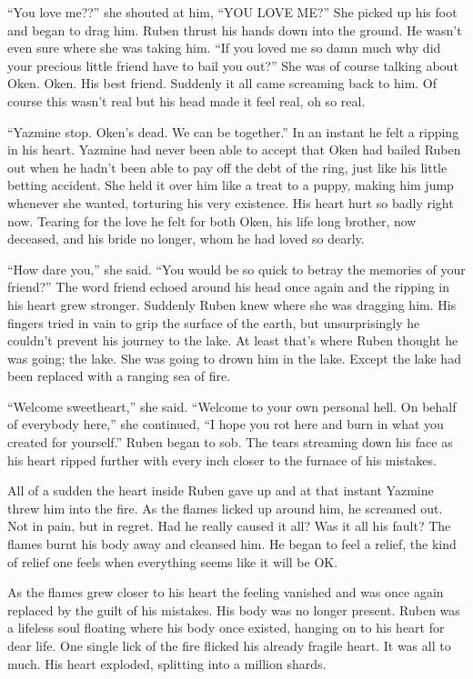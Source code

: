 ``You love me??'' she shouted at him, ``YOU LOVE ME?''  She picked up his foot and began to drag him.  Ruben thrust his hands down into the ground.  He wasn't even sure where she was taking him.  ``If you loved me so damn much why did your precious little friend have to bail you out?''  She was of course talking about Oken.  Oken.  His best friend.  Suddenly it all came screaming back to him.  Of course this wasn't real but his head made it feel real, oh so real.  

``Yazmine stop.  Oken's dead.  We can be together.''  In an instant he felt a ripping in his heart.  Yazmine had never been able to accept that Oken had bailed Ruben out when he hadn't been able to pay off the debt of the ring, just like his little betting accident.  She held it over him like a treat to a puppy, making him jump whenever she wanted, torturing his very existence.  His heart hurt so badly right now.  Tearing for the love he felt for both Oken, his life long brother, now deceased, and his bride no longer, whom he had loved so dearly.

``How dare you,'' she said.  ``You would be so quick to betray the memories of your friend?''  The word friend echoed around his head once again and the ripping in his heart grew stronger.  Suddenly Ruben knew where she was dragging him.  His fingers tried in vain to grip the surface of the earth, but unsurprisingly he couldn't prevent his journey to the lake.  At least that's where Ruben thought he was going;  the lake.  She was going to drown him in the lake.  Except the lake had been replaced with a ranging sea of fire.  

``Welcome sweetheart,'' she said.  ``Welcome to your own personal hell.  On behalf of everybody here,'' she continued, ``I hope you rot here and burn in what you created for yourself.''  Ruben began to sob.  The tears streaming down his face as his heart ripped further with every inch closer to the furnace of his mistakes.  

All of a sudden the heart inside Ruben gave up and at that instant Yazmine threw him into the fire.  As the flames licked up around him, he screamed out.  Not in pain, but in regret.  Had he really caused it all?  Was it all his fault?  The flames burnt his body away and cleansed him.  He began to feel a relief, the kind of relief one feels when everything seems like it will be OK.  

As the flames grew closer to his heart the feeling vanished and was once again replaced by the guilt of his mistakes.  His body was no longer present.  Ruben was a lifeless soul floating where his body once existed, hanging on to his heart for dear life.  One single lick of the fire flicked his already fragile heart.  It was all to much.  His heart exploded, splitting into a million shards.



